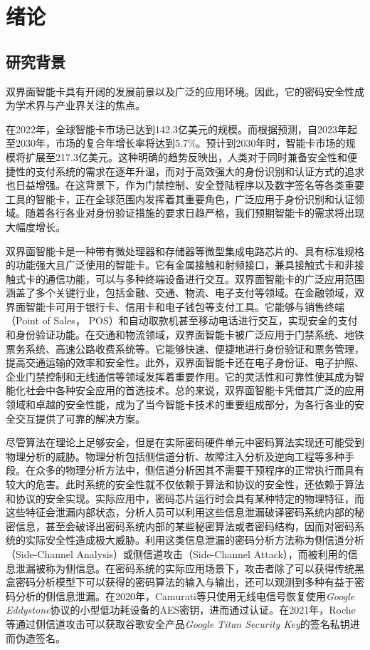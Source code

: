 \chapter{绪论}\label{chap:introduction}{
	\section{研究背景}
	双界面智能卡具有开阔的发展前景以及广泛的应用环境。因此，它的密码安全性成为学术界与产业界关注的焦点。
	
	在2022年，全球智能卡市场已达到142.3亿美元的规模。而根据预测，自2023年起至2030年，市场的复合年增长率将达到5.7\%\citep{GVR-1-68038-464-2}。预计到2030年时，智能卡市场的规模将扩展至217.3亿美元。这种明确的趋势反映出，人类对于同时兼备安全性和便捷性的支付系统的需求在逐年升温，而对于高效强大的身份识别和认证方式的追求也日益增强。在这背景下，作为门禁控制、安全登陆程序以及数字签名等各类重要工具的智能卡，正在全球范围内发挥着其重要角色，广泛应用于身份识别和认证领域。随着各行各业对身份验证措施的要求日趋严格，我们预期智能卡的需求将出现大幅度增长。
	
	双界面智能卡是一种带有微处理器和存储器等微型集成电路芯片的、具有标准规格的功能强大且广泛使用的智能卡。它有金属接触和射频接口，兼具接触式卡和非接触式卡的通信功能，可以与多种终端设备进行交互。双界面智能卡的广泛应用范围涵盖了多个关键行业，包括金融、交通、物流、电子支付等领域。在金融领域，双界面智能卡可用于银行卡、信用卡和电子钱包等支付工具。它能够与销售终端（Point of Sales， POS）和自动取款机甚至移动电话进行交互，实现安全的支付和身份验证功能。在交通和物流领域，双界面智能卡被广泛应用于门禁系统、地铁票务系统、高速公路收费系统等。它能够快速、便捷地进行身份验证和票务管理，提高交通运输的效率和安全性。此外，双界面智能卡还在电子身份证、电子护照、企业门禁控制和无线通信等领域发挥着重要作用。它的灵活性和可靠性使其成为智能化社会中各种安全应用的首选技术。总的来说，双界面智能卡凭借其广泛的应用领域和卓越的安全性能，成为了当今智能卡技术的重要组成部分，为各行各业的安全交互提供了可靠的解决方案。
	
	尽管算法在理论上足够安全，但是在实际密码硬件单元中密码算法实现还可能受到物理分析的威胁。物理分析包括侧信道分析、故障注入分析\citep{Biham97}及逆向工程\citep{Perrin17}等多种手段。在众多的物理分析方法中，侧信道分析因其不需要干预程序的正常执行而具有较大的危害。此时系统的安全性就不仅依赖于算法和协议的安全性，还依赖于算法和协议的安全实现。实际应用中，密码芯片运行时会具有某种特定的物理特征，而这些特征会泄漏内部状态，分析人员可以利用这些信息泄漏破译密码系统内部的秘密信息，甚至会破译出密码系统内部的某些秘密算法或者密码结构，因而对密码系统的实际安全性造成极大威胁。利用这类信息泄漏的密码分析方法称为侧信道分析（Side-Channel Analysis）或侧信道攻击（Side-Channel Attack），而被利用的信息泄漏被称为侧信息。在密码系统的实际应用场景下，攻击者除了可以获得传统黑盒密码分析模型下可以获得的密码算法的输入与输出，还可以观测到多种有益于密码分析的侧信息泄漏。在2020年，Camurati等\citep{Camurati20}只使用无线电信号恢复使用\textit{Google Eddystone}\citep{Eddystone}协议的小型低功耗设备的AES密钥，进而通过认证。在2021年，Roche等\citep{Roche21}通过侧信道攻击可以获取谷歌安全产品\textit{Google Titan Security Key}\citep{Titan}的签名私钥进而伪造签名。
	
}
